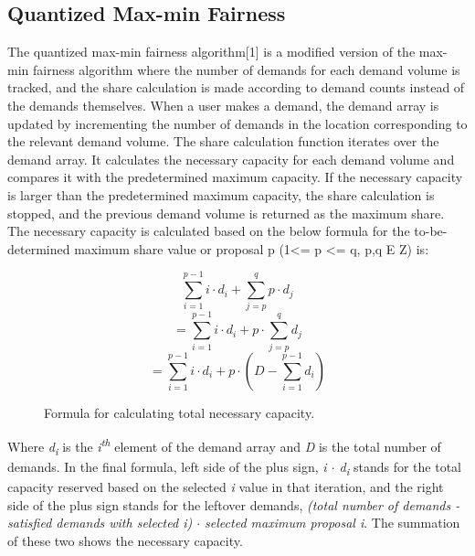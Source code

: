 \documentclass[a4paper,12pt]{report}
\begin{document}
\subsection{Quantized Max-min Fairness}
The quantized max-min fairness algorithm[1] is a modified version of the max-min fairness algorithm where the number of demands for each demand volume is tracked, and the share calculation is made according to demand counts instead of the demands themselves. When a user makes a demand, the demand array is updated by incrementing the number of demands in the location corresponding to the relevant demand volume.
The share calculation function iterates over the demand array. It calculates the necessary capacity for each demand volume and compares it with the predetermined maximum capacity. If the necessary capacity is larger than the predetermined maximum capacity, the share calculation is stopped, and the previous demand volume is returned as the maximum share.
The necessary capacity is calculated based on the below formula for the to-be-determined maximum share value or proposal p (1<= p <= q, p,q E Z) is:
\begin{figure}[H]
\[
\sum_{i=1}^{p-1} i \cdot d_{i} + \sum_{j=p}^{q} p \cdot d_{j}
\]
\[
=\sum_{i=1}^{p-1} i \cdot d_{i} + p \cdot \sum_{j=p}^{q} d_{j}
\]
\[
=\sum_{i=1}^{p-1} i \cdot d_{i} + p \cdot (D - \sum_{i=1}^{p-1} d_{i})
\]
\caption{Formula for calculating total necessary capacity.}
\end{figure}

\newpage

Where \textit{\textrm{d}\textsubscript{i}} is the \textit{\textrm{i}\textsuperscript{th}} element of the demand array and \textit{D} is the total number of demands. In the final formula, left side of the plus sign, \textit{i $\cdot$ \textrm{d}\textsubscript{i}}  stands for the total capacity reserved based on the selected \textit{i} value in that iteration, and the right side of the plus sign stands for the leftover demands, \textit{(total number of demands - satisfied demands with selected i) $\cdot$ selected maximum proposal i}. The summation of these two shows the necessary capacity. 
\end{document}
